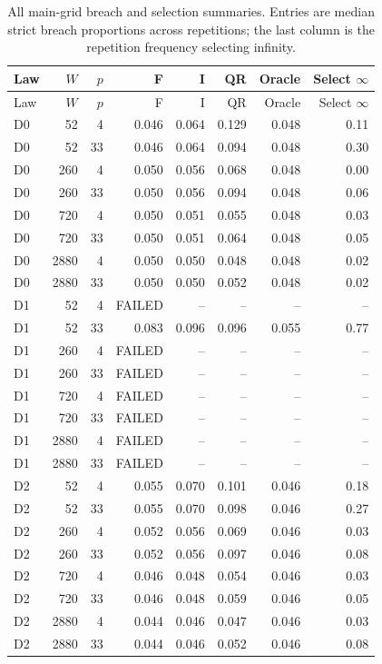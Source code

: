 \endgroup

\begingroup\scriptsize\setlength{\tabcolsep}{6pt}\renewcommand{\arraystretch}{1.12}

\begin{longtable}{lrr rrrrr}
\caption{All main-grid breach and selection summaries. Entries are median strict breach proportions across repetitions; the last column is the repetition frequency selecting infinity.}\label{tab:v8-mc-breaches}\\
\toprule Law & $W$ & $p$ & F & I & QR & Oracle & Select $\infty$\\\midrule\endfirsthead
\toprule Law & $W$ & $p$ & F & I & QR & Oracle & Select $\infty$\\\midrule\endhead
\bottomrule\endfoot
D0 & 52 & 4 & 0.046 & 0.064 & 0.129 & 0.048 & 0.11 \\
D0 & 52 & 33 & 0.046 & 0.064 & 0.094 & 0.048 & 0.30 \\
D0 & 260 & 4 & 0.050 & 0.056 & 0.068 & 0.048 & 0.00 \\
D0 & 260 & 33 & 0.050 & 0.056 & 0.094 & 0.048 & 0.06 \\
D0 & 720 & 4 & 0.050 & 0.051 & 0.055 & 0.048 & 0.03 \\
D0 & 720 & 33 & 0.050 & 0.051 & 0.064 & 0.048 & 0.05 \\
D0 & 2880 & 4 & 0.050 & 0.050 & 0.048 & 0.048 & 0.02 \\
D0 & 2880 & 33 & 0.050 & 0.050 & 0.052 & 0.048 & 0.02 \\
D1 & 52 & 4 & FAILED & -- & -- & -- & -- \\
D1 & 52 & 33 & 0.083 & 0.096 & 0.096 & 0.055 & 0.77 \\
D1 & 260 & 4 & FAILED & -- & -- & -- & -- \\
D1 & 260 & 33 & FAILED & -- & -- & -- & -- \\
D1 & 720 & 4 & FAILED & -- & -- & -- & -- \\
D1 & 720 & 33 & FAILED & -- & -- & -- & -- \\
D1 & 2880 & 4 & FAILED & -- & -- & -- & -- \\
D1 & 2880 & 33 & FAILED & -- & -- & -- & -- \\
D2 & 52 & 4 & 0.055 & 0.070 & 0.101 & 0.046 & 0.18 \\
D2 & 52 & 33 & 0.055 & 0.070 & 0.098 & 0.046 & 0.27 \\
D2 & 260 & 4 & 0.052 & 0.056 & 0.069 & 0.046 & 0.03 \\
D2 & 260 & 33 & 0.052 & 0.056 & 0.097 & 0.046 & 0.08 \\
D2 & 720 & 4 & 0.046 & 0.048 & 0.054 & 0.046 & 0.03 \\
D2 & 720 & 33 & 0.046 & 0.048 & 0.059 & 0.046 & 0.05 \\
D2 & 2880 & 4 & 0.044 & 0.046 & 0.047 & 0.046 & 0.03 \\
D2 & 2880 & 33 & 0.044 & 0.046 & 0.052 & 0.046 & 0.08 \\
\end{longtable}

